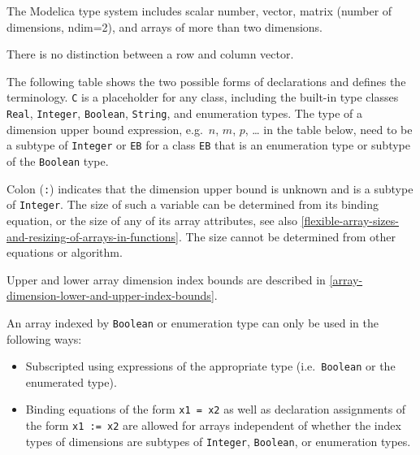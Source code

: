 The Modelica type system includes scalar number, vector, matrix (number
of dimensions, ndim=2), and arrays of more than two dimensions.

\begin{nonnormative}
There is no distinction between a row and column vector.
\end{nonnormative}

The following table shows the two possible forms of declarations and
defines the terminology. \lstinline!C! is a placeholder for any class, including the
built-in type classes \lstinline!Real!, \lstinline!Integer!, \lstinline!Boolean!, \lstinline!String!, and enumeration
types. The type of a dimension upper bound expression, e.g.\ $n$, $m$, $p$, \ldots
in the table below, need to be a subtype of \lstinline!Integer! or \lstinline!EB! for a class \lstinline!EB!
that is an enumeration type or subtype of the \lstinline!Boolean! type.

Colon (\lstinline!:!) indicates that the dimension upper bound is unknown and is a subtype of \lstinline!Integer!.  The size of such a variable can be determined from its binding equation, or the
size of any of its array attributes, see also \autoref{flexible-array-sizes-and-resizing-of-arrays-in-functions}.  The size cannot be determined from other equations or algorithm.

Upper and lower array dimension index bounds are described in \autoref{array-dimension-lower-and-upper-index-bounds}.

An array indexed by \lstinline!Boolean! or enumeration type can only be used in the following ways:
\begin{itemize}
\item
  Subscripted using expressions of the appropriate type (i.e.\ \lstinline!Boolean! or the enumerated type).
\item
  Binding equations of the form \lstinline!x1 = x2! as well as declaration assignments of the form \lstinline!x1 := x2! are allowed for arrays independent of
  whether the index types of dimensions are subtypes of \lstinline!Integer!, \lstinline!Boolean!, or enumeration types.
\end{itemize}

